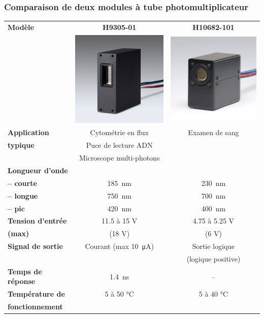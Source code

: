 \documentclass{article}
\begin{document}
    \subsubsection{Comparaison de deux modules à tube photomultiplicateur}
    \begin{table}[H]
        \centering
        \begin{tabular}{l|c|c}
        \textbf{Modèle}
            & \textbf{H9305-01}
            & \textbf{H10682-101}\\
            & \includegraphics[width=0.2\linewidth]{./images/photomulti-H9305.png}
            & \includegraphics[width=0.2\linewidth]{./images/photomulti-H10682.png}\\
        \hline
        \textbf{Application}        & Cytométrie en flux        & Examen de sang        \\
        \textbf{typique}            & Puce de lecture ADN       & \\
                                    & Microscope multi-photons  & \\
        \hline
        \textbf{Longueur d'onde}    &  & \\
        \textbf{-- courte}          & \SI{185}{\nano\meter}     & \SI{230}{\nano\meter}     \\
        \textbf{-- longue}          & \SI{750}{\nano\meter}     & \SI{700}{\nano\meter}     \\
        \textbf{-- pic}             & \SI{420}{\nano\meter}     & \SI{400}{\nano\meter}     \\
        \hline
        \textbf{Tension d'entrée}   & 11.5 à 15 V               & 4.75 à 5.25 V\\
        \textbf{(max)}              & (18 V)                    & (6 V)\\
        \hline
        \textbf{Signal de sortie}   & Courant (max \SI{10}{\micro\ampere})  & Sortie logique\\
                                    &                                       & (logique positive)\\
        \hline
        \textbf{Temps de réponse}   & \SI{1.4}{\nano\second}    & --\\
        \hline
        \textbf{Température de}     & 5 à 50 \si{\celsius}      & 5 à 40 \si{\celsius}\\
        \textbf{fonctionnement}     & & \\
    \end{tabular}
    \end{table}
\end{document}
